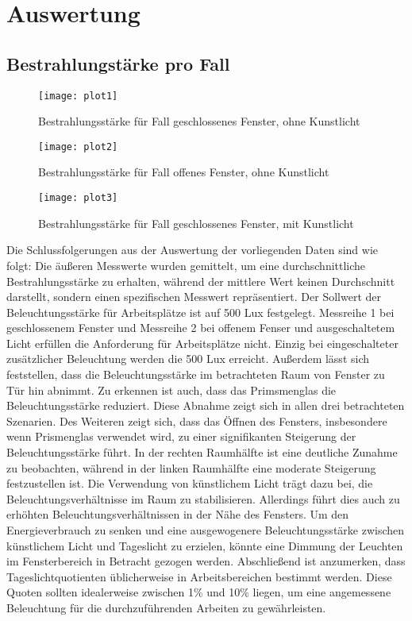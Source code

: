 \section{Auswertung}
\label{sec:Auswertung}
\subsection{Bestrahlungstärke pro Fall}
\begin{figure}[H]
    \centering
    \texttt{[image: plot1]}
    \caption{Bestrahlungsstärke für Fall geschlossenes Fenster, ohne Kunstlicht}
    \label{fig:plot1_28062023}
  \end{figure}
 
  \begin{figure}[H]
    \centering
    \texttt{[image: plot2]}
    \caption{Bestrahlungsstärke für Fall offenes Fenster, ohne Kunstlicht}
    \label{fig:plot2_28062023}
  \end{figure}

  \begin{figure}[H]
    \centering
    \texttt{[image: plot3]}
    \caption{Bestrahlungsstärke für Fall geschlossenes Fenster, mit Kunstlicht}
    \label{fig:plot3_28062023}
  \end{figure}

  Die Schlussfolgerungen aus der Auswertung der vorliegenden Daten sind wie folgt: Die äußeren Messwerte wurden gemittelt, um eine durchschnittliche Bestrahlungsstärke zu erhalten, während der mittlere Wert keinen Durchschnitt darstellt, sondern einen spezifischen Messwert repräsentiert.
Der Sollwert der Beleuchtungsstärke für Arbeitsplätze ist auf 500 Lux festgelegt. Messreihe 1 bei geschlossenem Fenster und Messreihe 2 bei offenem Fenser und ausgeschaltetem Licht erfüllen die Anforderung für Arbeitsplätze nicht. Einzig bei eingeschalteter zusätzlicher Beleuchtung werden die 500 Lux erreicht.
Außerdem lässt sich feststellen, dass die Beleuchtungsstärke im betrachteten Raum von Fenster zu Tür hin abnimmt. Zu erkennen ist auch, dass das Primsmenglas die Beleuchtungsstärke reduziert. Diese Abnahme zeigt sich in allen drei betrachteten Szenarien.
Des Weiteren zeigt sich, dass das Öffnen des Fensters, insbesondere wenn Prismenglas verwendet wird, zu einer signifikanten Steigerung der Beleuchtungsstärke führt. In der rechten Raumhälfte ist eine deutliche Zunahme zu beobachten, während in der linken Raumhälfte eine moderate Steigerung festzustellen ist.
Die Verwendung von künstlichem Licht trägt dazu bei, die Beleuchtungsverhältnisse im Raum zu stabilisieren. Allerdings führt dies auch zu erhöhten Beleuchtungsverhältnissen in der Nähe des Fensters. Um den Energieverbrauch zu senken und eine ausgewogenere Beleuchtungsstärke zwischen künstlichem Licht und Tageslicht zu erzielen, könnte eine Dimmung der Leuchten im Fensterbereich in Betracht gezogen werden.
Abschließend ist anzumerken, dass Tageslichtquotienten üblicherweise in Arbeitsbereichen bestimmt werden. Diese Quoten sollten idealerweise zwischen 1\% und 10\% liegen, um eine angemessene Beleuchtung für die durchzuführenden Arbeiten zu gewährleisten.

